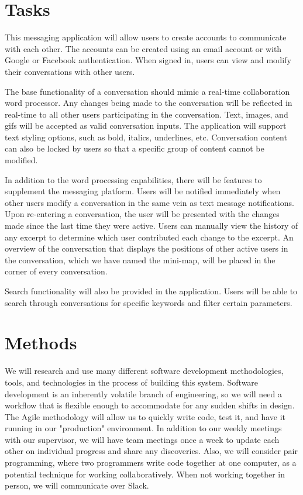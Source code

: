 \documentclass[letterpaper,12pt]{report}
\begin{document}
	\section*{Tasks}
	\markright{}
	This messaging application will allow users to create accounts to
	communicate with each other. The accounts can be created using an email
	account or with Google or Facebook authentication. When signed in, users
	can view and modify their conversations with other users.

	The base functionality of a conversation should mimic a real-time
	collaboration word processor. Any changes being made to the conversation
	will be reflected in real-time to all other users participating in the
	conversation. Text, images, and gifs will be accepted as valid conversation
	inputs. The application will support text styling options, such as bold,
	italics, underlines, etc. Conversation content can also be locked by users
	so that a specific group of content cannot be modified.

	In addition to the word processing capabilities, there will be features to
	supplement the messaging platform.  Users will be notified immediately when
	other users modify a conversation in the same vein as text message
	notifications. Upon re-entering a conversation, the user will be presented
	with the changes made since the last time they were active. Users can
	manually view the history of any excerpt to determine which user
	contributed each change to the excerpt. An overview of the conversation
	that displays the positions of other active users in the conversation, which 
	we have named the mini-map, will be placed in the corner of every 
	conversation.

	Search functionality will also be provided in the application. Users will
	be able to search through conversations for specific keywords and filter
	certain parameters.

	\section*{Methods}
	\markright{}
	We will research and use many different software development methodologies,
	tools, and technologies in the process of building this system. Software
	development is an inherently volatile branch of engineering, so we will
	need a workflow that is flexible enough to accommodate for any sudden shifts
	in design. The Agile methodology will allow us to quickly write code, test
	it, and have it running in our "production" environment. In addition to our
	weekly meetings with our supervisor, we will have team meetings once a week
	to update each other on individual progress and share any discoveries.
	Also, we will consider pair programming, where two programmers write code
	together at one computer, as a potential technique for working
	collaboratively. When not working together in person, we will communicate
	over Slack.
\end{document}

